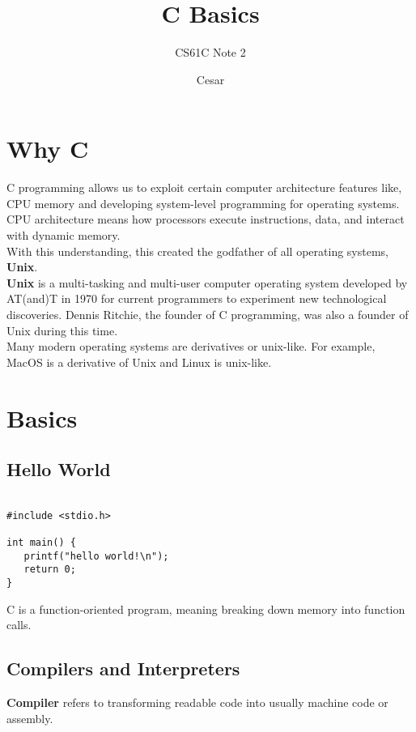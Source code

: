 \documentclass{article}
\title{C Basics}
\author{CS61C Note 2}
\date{Cesar}
\begin{document}
\maketitle

\section{Why C}
C programming allows us to exploit certain computer architecture features like, CPU memory and developing system-level programming for operating
systems. \\

\noindent CPU architecture means how processors execute instructions, data, and interact with dynamic memory. \\

\noindent With this understanding, this created the godfather of all operating systems, \textbf{Unix}. \\

\noindent \textbf{Unix} is a multi-tasking and multi-user computer operating system developed by AT(and)T in 1970 for current programmers to experiment new technological 
discoveries. Dennis Ritchie, the founder of C programming, was also a founder of Unix during this time. \\

\noindent Many modern operating systems are derivatives or unix-like. For example, MacOS is a derivative of Unix and Linux is unix-like.

\section{Basics}
\subsection*{Hello World}

\begin{verbatim}

#include <stdio.h>

int main() {
   printf("hello world!\n");
   return 0;
}

\end{verbatim}

\noindent C is a function-oriented program, meaning breaking down memory into function calls. \\

\subsection*{Compilers and Interpreters}
\textbf{Compiler} refers to transforming readable code into usually machine code or assembly. \\
\end{document}

